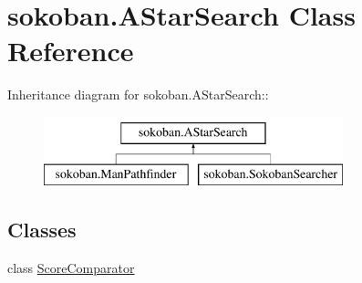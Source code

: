 \hypertarget{classsokoban_1_1AStarSearch}{
\section{sokoban.AStarSearch Class Reference}
\label{classsokoban_1_1AStarSearch}
}
Inheritance diagram for sokoban.AStarSearch::\begin{figure}[H]
\begin{center}
\leavevmode
\includegraphics[height=2cm]{classsokoban_1_1AStarSearch}
\end{center}
\end{figure}
\subsection*{Classes}
\begin{CompactItemize}
\item 
class \hyperlink{classsokoban_1_1AStarSearch_1_1ScoreComparator}{ScoreComparator}
\end{CompactItemize}
